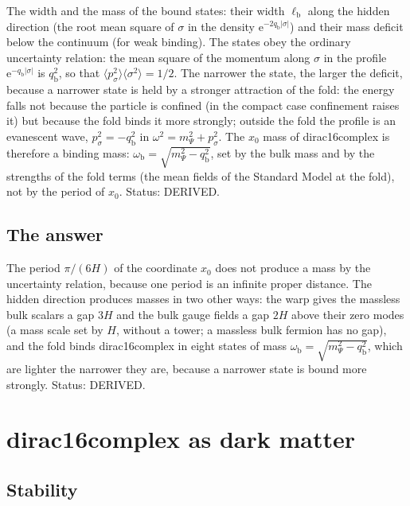 \documentclass[
  10pt,
]{article}
\begin{document}
The width and the mass of the bound states: their width
\(\ell_{\mathrm{b}}\) along the hidden direction (the root mean square
of \(\sigma\) in the density
\(\mathrm{e}^{-2q_{\mathrm{b}}\lvert\sigma\rvert}\)) and their mass
deficit below the continuum (for weak binding). The states obey the
ordinary uncertainty relation: the mean square of the momentum along
\(\sigma\) in the profile
\(\mathrm{e}^{-q_{\mathrm{b}}\lvert\sigma\rvert}\) is
\(q_{\mathrm{b}}^2\), so that
\(\langle p_\sigma^2\rangle\langle\sigma^2\rangle = 1/2\). The narrower
the state, the larger the deficit, because a narrower state is held by a
stronger attraction of the fold: the energy falls not because the
particle is confined (in the compact case confinement raises it) but
because the fold binds it more strongly; outside the fold the profile is
an evanescent wave, \(p_\sigma^2 = -q_{\mathrm{b}}^2\) in
\(\omega^2 = m_\Psi^2 + p_\sigma^2\). The \(x_0\) mass of dirac16complex
is therefore a binding mass:
\(\omega_{\mathrm{b}} = \sqrt{m_\Psi^2 - q_{\mathrm{b}}^2}\), set by the
bulk mass and by the strengths of the fold terms (the mean fields of the
Standard Model at the fold), not by the period of \(x_0\). Status:
DERIVED.

\hypertarget{the-answer}{%
\subsection{The answer}\label{the-answer}}

The period \(\pi/(6H)\) of the coordinate \(x_0\) does not produce a
mass by the uncertainty relation, because one period is an infinite
proper distance. The hidden direction produces masses in two other ways:
the warp gives the massless bulk scalars a gap \(3H\) and the bulk gauge
fields a gap \(2H\) above their zero modes (a mass scale set by \(H\),
without a tower; a massless bulk fermion has no gap), and the fold binds
dirac16complex in eight states of mass
\(\omega_{\mathrm{b}} = \sqrt{m_\Psi^2 - q_{\mathrm{b}}^2}\), which are
lighter the narrower they are, because a narrower state is bound more
strongly. Status: DERIVED.

\hypertarget{dirac16complex-as-dark-matter}{%
\section{dirac16complex as dark
matter}\label{dirac16complex-as-dark-matter}}

\hypertarget{stability}{%
\subsection{Stability}\label{stability}}
\end{document}
